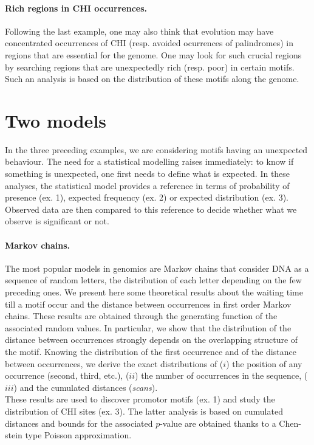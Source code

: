 \documentclass[11pt,a4paper,french]{article}
\begin{document}
\paragraph{Rich regions in CHI occurrences.}
Following the last example, one may also think that evolution may have
concentrated occurrences of CHI (resp. avoided ocurrences of
palindromes) in regions that are essential for the genome. One may
look for such crucial regions by searching regions that are
unexpectedly rich (resp. poor) in certain motifs. Such an analysis is
based on the distribution of these motifs along the genome.

\section*{Two models}

In the three preceding examples, we are considering motifs having an
unexpected behaviour. The need for a statistical modelling raises
immediately: to know if something is unexpected, one first needs to
define what is expected.  In these analyses, the statistical model
provides a reference in terms of probability of presence (ex. 1),
expected frequency (ex. 2) or expected distribution (ex. 3). Observed
data are then compared to this reference to decide whether what we
observe is significant or not.

\paragraph{Markov chains.}
The most popular models in genomics are Markov chains that consider
DNA as a sequence of random letters, the distribution of each letter
depending on the few preceding ones.  We present here some theoretical
results about the waiting time till a motif occur and the distance
between occurrences in first order Markov chains. These results are
obtained through the generating function of the associated random
values. In particular, we show that the distribution of the distance
between occurrences strongly depends on the overlapping structure of
the motif.  Knowing the distribution of the first occurrence and of
the distance between occurrences, we derive the exact distributions of
($i$) the position of any occurrence (second, third, etc.), ($ii$) the
number of occurrences in the sequence, ($iii$) and the cumulated
distances ({\em scans}). \\
These results are used to discover promotor motifs (ex. 1) and study
the distribution of CHI sites (ex. 3). The latter analysis is based on
cumulated distances and bounds for the associated $p$-value are
obtained thanks to a Chen-stein type Poisson approximation.
\end{document}
